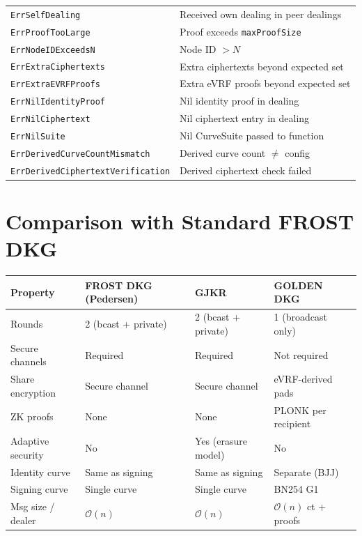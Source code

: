 \documentclass[11pt,a4paper]{article}
\newcommand{\bigO}{\mathcal{O}}
\begin{document}
\begin{center}
\begin{tabular}{@{}lp{7.5cm}@{}}
\texttt{ErrSelfDealing} & Received own dealing in peer dealings \\
\texttt{ErrProofTooLarge} & Proof exceeds \texttt{maxProofSize} \\
\texttt{ErrNodeIDExceedsN} & Node ID $> N$ \\
\texttt{ErrExtraCiphertexts} & Extra ciphertexts beyond expected set \\
\texttt{ErrExtraEVRFProofs} & Extra eVRF proofs beyond expected set \\
\texttt{ErrNilIdentityProof} & Nil identity proof in dealing \\
\texttt{ErrNilCiphertext} & Nil ciphertext entry in dealing \\
\texttt{ErrNilSuite} & Nil CurveSuite passed to function \\
\texttt{ErrDerivedCurveCountMismatch} & Derived curve count $\ne$ config \\
\texttt{ErrDerivedCiphertextVerification} & Derived ciphertext check failed \\
\bottomrule
\end{tabular}
\end{center}

\section{Comparison with Standard FROST DKG}
\label{sec:comparison}

\begin{center}
\renewcommand{\arraystretch}{1.3}
\begin{tabular}{@{}llll@{}}
\toprule
\textbf{Property} & \textbf{FROST DKG (Pedersen)} & \textbf{GJKR}~\cite{gjkr1999} & \textbf{GOLDEN DKG} \\
\midrule
Rounds & 2 (bcast + private) & 2 (bcast + private) & 1 (broadcast only) \\
Secure channels & Required & Required & Not required \\
Share encryption & Secure channel & Secure channel & eVRF-derived pads \\
ZK proofs & None & None & PLONK per recipient \\
Adaptive security & No & Yes (erasure model) & No \\
Identity curve & Same as signing & Same as signing & Separate (BJJ) \\
Signing curve & Single curve & Single curve & BN254 G1 \\
Msg size / dealer & $\bigO(n)$ & $\bigO(n)$ & $\bigO(n)$ ct + proofs \\
\bottomrule
\end{tabular}
\end{center}
\end{document}
